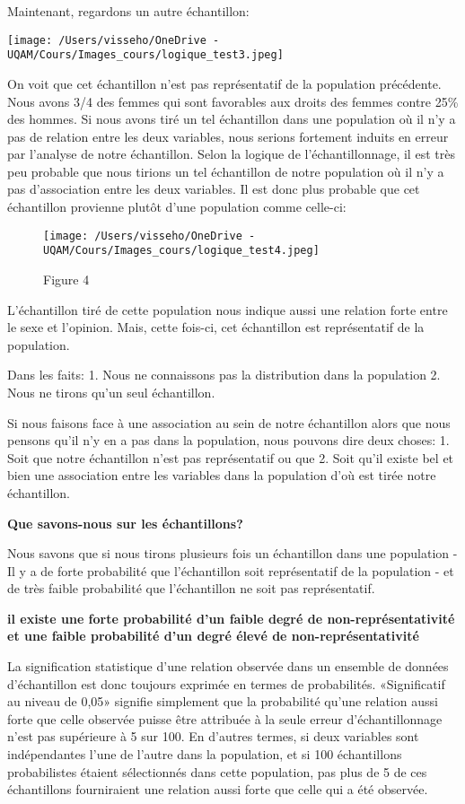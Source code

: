 \documentclass[
]{article}
\begin{document}
Maintenant, regardons un autre échantillon:

\texttt{[image: /Users/visseho/OneDrive - UQAM/Cours/Images\_cours/logique\_test3.jpeg]}

On voit que cet échantillon n'est pas représentatif de la population
précédente. Nous avons 3/4 des femmes qui sont favorables aux droits des
femmes contre 25\% des hommes. Si nous avons tiré un tel échantillon
dans une population où il n'y a pas de relation entre les deux
variables, nous serions fortement induits en erreur par l'analyse de
notre échantillon. Selon la logique de l'échantillonnage, il est très
peu probable que nous tirions un tel échantillon de notre population où
il n'y a pas d'association entre les deux variables. Il est donc plus
probable que cet échantillon provienne plutôt d'une population comme
celle-ci:

\begin{figure}
\centering
\texttt{[image: /Users/visseho/OneDrive - UQAM/Cours/Images\_cours/logique\_test4.jpeg]}
\caption{Figure 4}
\end{figure}

L'échantillon tiré de cette population nous indique aussi une relation
forte entre le sexe et l'opinion. Mais, cette fois-ci, cet échantillon
est représentatif de la population.

Dans les faits: 1. Nous ne connaissons pas la distribution dans la
population 2. Nous ne tirons qu'un seul échantillon.

Si nous faisons face à une association au sein de notre échantillon
alors que nous pensons qu'il n'y en a pas dans la population, nous
pouvons dire deux choses: 1. Soit que notre échantillon n'est pas
représentatif ou que 2. Soit qu'il existe bel et bien une association
entre les variables dans la population d'où est tirée notre échantillon.

\textbf{Que savons-nous sur les échantillons? }

Nous savons que si nous tirons plusieurs fois un échantillon dans une
population - Il y a de forte probabilité que l'échantillon soit
représentatif de la population - et de très faible probabilité que
l'échantillon ne soit pas représentatif.

\textbf{il existe une forte probabilité d'un faible degré de
non-représentativité et une faible probabilité d'un degré élevé de
non-représentativité}

La signification statistique d'une relation observée dans un ensemble de
données d'échantillon est donc toujours exprimée en termes de
probabilités. «Significatif au niveau de 0,05» signifie simplement que
la probabilité qu'une relation aussi forte que celle observée puisse
être attribuée à la seule erreur d'échantillonnage n'est pas supérieure
à 5 sur 100. En d'autres termes, si deux variables sont indépendantes
l'une de l'autre dans la population, et si 100 échantillons
probabilistes étaient sélectionnés dans cette population, pas plus de 5
de ces échantillons fourniraient une relation aussi forte que celle qui
a été observée.
\end{document}
